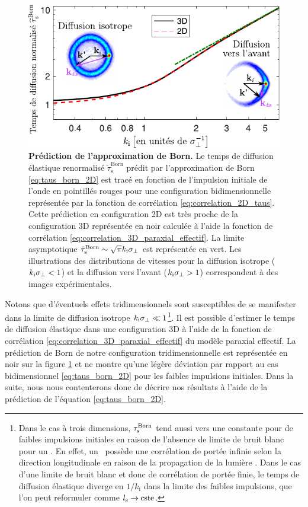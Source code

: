 \begin{figure}
\centering
\includegraphics[scale=1]{Fig/TauS_PRL/prediction_taus_born.pdf}
\caption{\textbf{Prédiction de l'approximation de Born.} Le temps de diffusion élastique renormalisé $\tilde{\tau}_{\mathrm{s}}^{\mathrm{Born}}$ prédit par l'approximation de Born \ref{eq:taus_born_2D} est tracé en fonction de l'impulsion initiale de l'onde en pointillés rouges pour une configuration bidimensionnelle représentée par la fonction de corrélation \ref{eq:correlation_2D_taus}. Cette prédiction en configuration 2D est très proche de la configuration 3D représentée en noir calculée à l'aide la fonction de corrélation \ref{eq:correlation_3D_paraxial_effectif}. La limite asymptotique $\tilde{\tau}_{\mathrm{s}}^{\mathrm{Born}} \sim \sqrt{\pi} k_{\mathrm{i}} \sigma_{\perp}$ est représentée en vert. Les illustrations des distributions de vitesses pour la diffusion isotrope ($k_{\mathrm{i}} \sigma_{\perp}<1$) et la diffusion vers l'avant ($k_{\mathrm{i}} \sigma_{\perp}>1$) correspondent à des images expérimentales.}
\label{fig:prediction_taus_born}
\end{figure}

Notons que d'éventuels effets tridimensionnels sont susceptibles de se manifester dans la limite de diffusion isotrope $k_{\mathrm{i}}\sigma_{\perp} \ll 1$\footnote{Dans le cas à trois dimensions, $\tau_{\mathrm{s}}^{\mathrm{Born}}$ tend aussi vers une constante pour de faibles impulsions initiales en raison de l'absence de limite de bruit blanc pour un \speckle . En effet, un \speckle\ possède une corrélation de portée infinie selon la direction longitudinale en raison de la propagation de la lumière \citep{goodman2007speckle}. Dans le cas d'une limite de bruit blanc et donc de corrélation de portée finie, le temps de diffusion élastique diverge en $1/k_{\mathrm{i}}$ dans la limite des faibles impulsions, que l'on peut reformuler comme $l_{\mathrm{s}}\rightarrow\mathrm{cste}$. }. Il est possible d'estimer le temps de diffusion élastique dans une configuration 3D à l'aide de la fonction de corrélation \ref{eq:correlation_3D_paraxial_effectif} du modèle paraxial effectif. La prédiction de Born de notre configuration tridimensionnelle est représentée en noir sur la figure \ref{fig:prediction_taus_born} et ne montre qu'une légère déviation par rapport au cas bidimensionnel \ref{eq:taus_born_2D} pour les faibles impulsions initiales. Dans la suite, nous nous contenterons donc de décrire nos résultats à l'aide de la prédiction de l'équation \ref{eq:taus_born_2D}.



